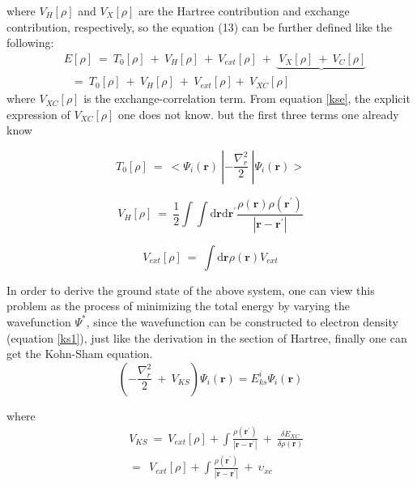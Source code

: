 \documentclass[a4paper, 12pt, titlepage,oneside,drop]{kthesis}
\begin{document}
\noindent where $V_\textit{H}[\rho]$ and $ V_\textit{X}[\rho] $ are the Hartree contribution and exchange contribution, respectively, so the equation (13) can be further defined like
 the following:
\begin{equation}\label{ccc}
\begin{split}
&E[\rho]\ = \ T_{0}[\rho] \ + \ V_\textit{H}[\rho] \ + \ V_\textit{ext}[\rho] \ + \ \underbrace{\ V_\textit{X}[\rho]  \ + \ V_\textit{C}[\rho]}  \\
&\ \ \ = \ T_{0}[\rho] \ + \ V_\textit{H}[\rho] \ + \ V_\textit{ext}[\rho] + \ V_\textit{XC}[\rho]
\end{split}\end{equation}
\noindent where $V_\textit{XC}[\rho]$  is the exchange-correlation term. From equation \ref{kse}, the explicit expression of $V_\textit{XC}[\rho]$ one does not know. 
 but the first three terms one already know

\begin{equation}
 T_{0}[\rho]\ = \ < \Psi_{i}(\textbf{r}) \ | -\frac{\nabla^{2}_{r}}{2} \ | \Psi_{i}(\textbf{r}) >
\end{equation}

\begin{equation}
V_\textit{H}[\rho] \ = \ \frac{1}{2} \int \int \mathrm{d} {\textbf{r}} \mathrm{d}{\textbf{r}^{\prime}} \frac{\rho({\textbf{r}})\rho(\textbf{r}^{\prime})}{|{\textbf{r}}-{\textbf{r}}^{\prime}|} 
\end{equation}


\begin{equation}
V_\textit{ext}[\rho]\ = \ \int \mathrm{d}{\textbf{r}} \rho(\textbf{r}) V_\textit{ext} 
\end{equation}

\noindent In order to derive the ground state of the above system, one can view this problem as the process of minimizing the total energy by varying the wavefunction $\Psi^*$, since
 the wavefunction can be constructed to electron density (equation \ref{ks1}), just like the derivation in the section of Hartree, finally one can get the Kohn-Sham equation.
\begin{equation}\label{aaa}
 (-\frac{\nabla^{2}_{r}}{2}\ + \ V_\textit{KS}) \Psi_{\textit{i}}(\textbf{r}) = E_{\textit{ks}}^{\textit{i}} \Psi_{\textit{i}}(\textbf{r})
\end{equation}

\noindent where
\begin{equation}\begin{split}
&\ V_\textit{KS} \ = \ V_\textit{ext}[\rho] + \int \frac{\rho(\textbf{r}^{\prime})}{|{\textbf{r}}-{\textbf{r}}^{\prime}|} \ + \ \frac{\delta{E_\textit{XC}}}{\delta{\rho(\textbf{r})}} \\
&\ = \ \ V_\textit{ext}[\rho] + \int \frac{\rho(\textbf{r}^{\prime})}{|{\textbf{r}}-{\textbf{r}}^{\prime}|} \ + \ \upsilon_\textit{xc}
\end{split}
\end{equation}
\end{document}
